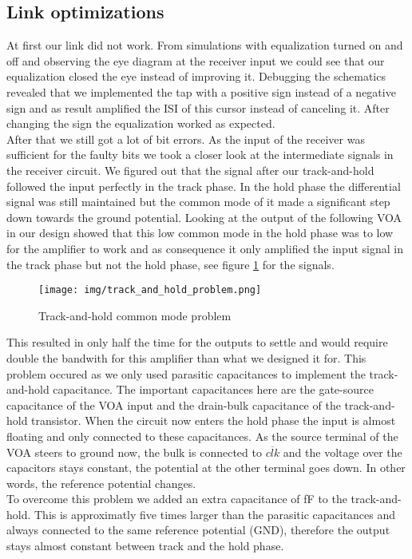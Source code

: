 \subsection{Link optimizations}
\label{sec:link_opt}
At first our link did not work. From simulations with equalization turned on and off and observing the eye diagram at the receiver input we could see that our equalization closed the eye instead of improving it. Debugging the schematics revealed that we implemented the tap with a positive sign instead of a negative sign and as result amplified the ISI of this cursor instead of canceling it. After changing the sign the equalization worked as expected.\\
After that we still got a lot of bit errors. As the input of the receiver was sufficient for the faulty bits we took a closer look at the intermediate signals in the receiver circuit. We figured out that the signal after our track-and-hold followed the input perfectly in the track phase. In the hold phase the differential signal was still maintained but the common mode of it made a significant step down towards the ground potential. Looking at the output of the following VOA in our design showed that this low common mode in the hold phase was to low for the amplifier to work and as consequence it only amplified the input signal in the track phase but not the hold phase, see figure \ref{fig:track_and_hold_problem} for the signals.

\begin{figure}[H]
  \centering
  {\texttt{[image: img/track\_and\_hold\_problem.png]}}
  \caption{Track-and-hold common mode problem}
  \label{fig:track_and_hold_problem}
\end{figure}

This resulted in only half the time for the outputs to settle and would require double the bandwith for this amplifier than what we designed it for. This problem occured as we only used parasitic capacitances to implement the track-and-hold capacitance. The important capacitances here are the gate-source capacitance of the VOA input and the drain-bulk capacitance of the track-and-hold transistor. When the circuit now enters the hold phase the input is almost floating and only connected to these capacitances. As the source terminal of the VOA steers to ground now, the bulk is connected to $\overline{clk}$ and the voltage over the capacitors stays constant, the potential at the other terminal goes down. In other words, the reference potential changes.\\
To overcome this problem we added an extra capacitance of \unit[20]{fF} to the track-and-hold. This is approximatly five times larger than the parasitic capacitances and always connected to the same reference potential (GND), therefore the output stays almost constant between track and the hold phase.
